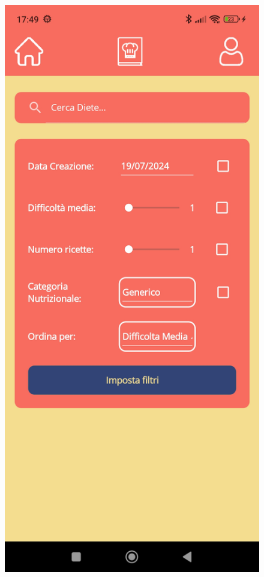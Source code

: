﻿\documentclass[a4paper,12pt]{report}
\begin{document}
\begin{figure}[h!]
\begin{minipage}{.5\textwidth}
    \end{minipage}
    \begin{minipage}{.5\textwidth}
        \centering
        \includegraphics[width=0.9\linewidth]{app_images/Filter2.jpg}
    \end{minipage}
\end{figure}
\end{document}
